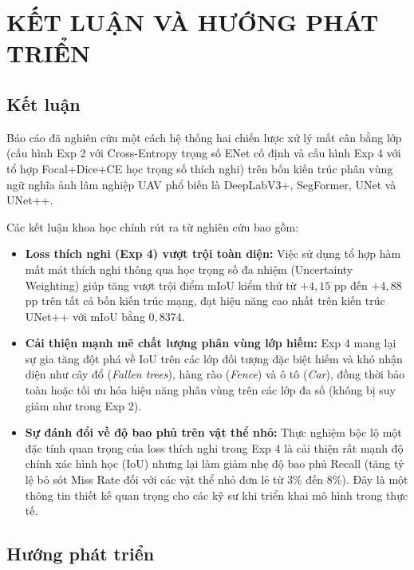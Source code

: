 \chapter{KẾT LUẬN VÀ HƯỚNG PHÁT TRIỂN}
\label{ch:ket_luan}

\section{Kết luận}

Báo cáo đã nghiên cứu một cách hệ thống hai chiến lược xử lý mất cân bằng lớp (cấu hình Exp 2 với Cross-Entropy trọng số ENet cố định và cấu hình Exp 4 với tổ hợp Focal+Dice+CE học trọng số thích nghi) trên bốn kiến trúc phân vùng ngữ nghĩa ảnh lâm nghiệp UAV phổ biến là DeepLabV3+, SegFormer, UNet và UNet++. 

Các kết luận khoa học chính rút ra từ nghiên cứu bao gồm:
\begin{itemize}[leftmargin=1.4cm]
  \item \textbf{Loss thích nghi (Exp 4) vượt trội toàn diện:} Việc sử dụng tổ hợp hàm mất mát thích nghi thông qua học trọng số đa nhiệm (Uncertainty Weighting) giúp tăng vượt trội điểm mIoU kiểm thử từ $+4{,}15$ pp đến $+4{,}88$ pp trên tất cả bốn kiến trúc mạng, đạt hiệu năng cao nhất trên kiến trúc UNet++ với mIoU bằng $0{,}8374$.
  \item \textbf{Cải thiện mạnh mẽ chất lượng phân vùng lớp hiếm:} Exp 4 mang lại sự gia tăng đột phá về IoU trên các lớp đối tượng đặc biệt hiếm và khó nhận diện như cây đổ (\textit{Fallen trees}), hàng rào (\textit{Fence}) và ô tô (\textit{Car}), đồng thời bảo toàn hoặc tối ưu hóa hiệu năng phân vùng trên các lớp đa số (không bị suy giảm như trong Exp 2).
  \item \textbf{Sự đánh đổi về độ bao phủ trên vật thể nhỏ:} Thực nghiệm bộc lộ một đặc tính quan trọng của loss thích nghi trong Exp 4 là cải thiện rất mạnh độ chính xác hình học (IoU) nhưng lại làm giảm nhẹ độ bao phủ Recall (tăng tỷ lệ bỏ sót Miss Rate đối với các vật thể nhỏ đơn lẻ từ $3\%$ đến $8\%$). Đây là một thông tin thiết kế quan trọng cho các kỹ sư khi triển khai mô hình trong thực tế.
\end{itemize}

\section{Hướng phát triển}
\label{sec:huong_morong}

